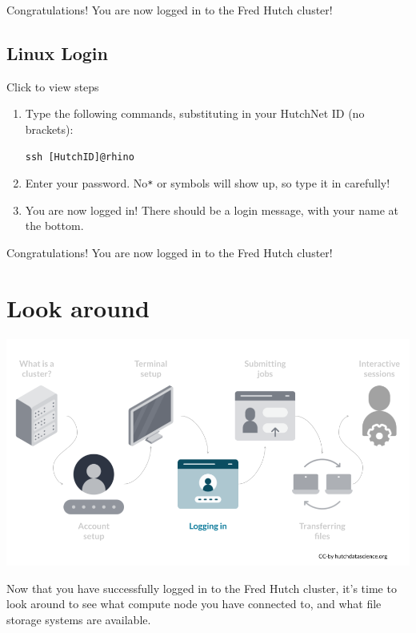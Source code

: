 \documentclass[
]{book}
\begin{document}
Congratulations! You are now logged in to the Fred Hutch cluster!

\hypertarget{linux-login}{%
\section{Linux Login}\label{linux-login}}

Click to view steps

\begin{enumerate}
\def\labelenumi{\arabic{enumi}.}
\item
  Type the following commands, substituting in your HutchNet ID (no brackets):

\begin{verbatim}
ssh [HutchID]@rhino
\end{verbatim}
\item
  Enter your password. No\texttt{*} or symbols will show up, so type it in carefully!\\
\item
  You are now logged in! There should be a login message, with your name at the bottom.
\end{enumerate}

Congratulations! You are now logged in to the Fred Hutch cluster!

\hypertarget{look-around}{%
\chapter{Look around}\label{look-around}}

\begin{center}\includegraphics[width=0.8\linewidth]{resources/images/05-look-around_files/figure-latex//1BQxrVYdKZTbpCaF-i_q9w7s9x034lEXpQZDU-Sl09cs_gff2211b72f_1_206} \end{center}

Now that you have successfully logged in to the Fred Hutch cluster, it's time to look around to see what compute node you have connected to, and what file storage systems are available.
\end{document}
